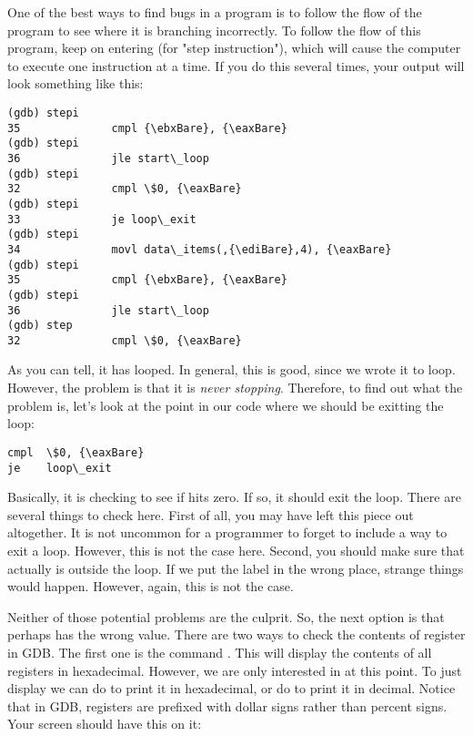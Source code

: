 One of the best ways to find bugs in a program is to follow the flow of 
the program to see where it is branching incorrectly.  To follow the
flow of this program, keep on entering  (for
"step instruction"), which will cause the computer to execute one 
instruction at a time.  If you do this several times, your output will
look something like this:

\begin{simpletyping}
\begin{lstlisting}
(gdb) stepi
35              cmpl {\ebxBare}, {\eaxBare}           
(gdb) stepi
36              jle start\_loop            
(gdb) stepi
32              cmpl \$0, {\eaxBare}             
(gdb) stepi
33              je loop\_exit
(gdb) stepi
34              movl data\_items(,{\ediBare},4), {\eaxBare}
(gdb) stepi
35              cmpl {\ebxBare}, {\eaxBare}           
(gdb) stepi
36              jle start\_loop            
(gdb) step
32              cmpl \$0, {\eaxBare}             
\end{lstlisting}
\end{simpletyping}

As you can tell, it has looped.  In general, this is good, since we wrote it
to loop.  However, the problem is that it is 
\emph{never stopping}.  Therefore, to find out what the problem
is, let's look at the point in our code where we should be exitting the loop:

\begin{simpletyping}
\begin{lstlisting}
cmpl  \$0, {\eaxBare}
je    loop\_exit
\end{lstlisting}
\end{simpletyping}

Basically, it is checking to see if {\eaxReg} hits zero.  If so, it should exit
the loop.  There are several things to check here.  
First of all, 
you may have left this piece out altogether.  It is
not uncommon for a programmer to forget to include a way to exit a loop.
However, this is not the case here.
Second, you should make sure that  actually is 
outside the loop.  If we put the label in the wrong place, strange things
would happen.  However, again, this is not the case. 

Neither of those potential problems are the culprit.  So, the next
option is that perhaps {\eaxReg} has the wrong value.  There are two ways to
check the contents of register in GDB.  The first one is the command
.  This will display the contents of
all registers in hexadecimal.  However, we are only interested in {\eaxReg}
at this point.  To just display {\eaxReg} we can do 
to print it in hexadecimal, or do  to print
it in decimal.  Notice that in GDB, registers are prefixed with dollar
signs rather than percent signs.  Your screen should have this on it:

